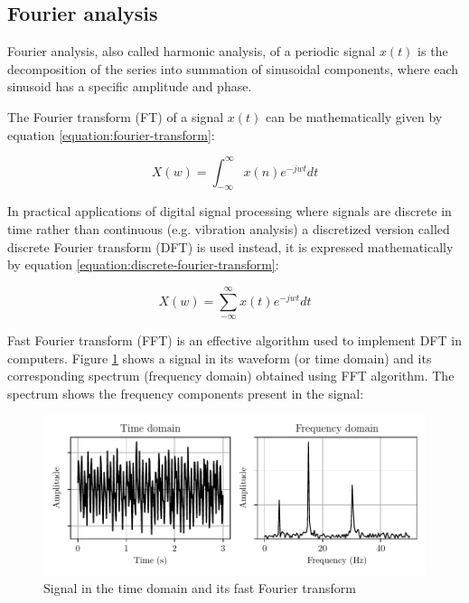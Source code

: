 \subsection{Fourier analysis}
Fourier analysis, also called harmonic analysis, of a periodic signal $x(t)$ is the decomposition of the series into summation of sinusoidal components, where each sinusoid has a specific amplitude and phase.

The Fourier transform (FT) of a signal $x(t)$ can be mathematically given by equation \ref{equation:fourier-transform}:

\begin{equation}
    X(w) = \int_{-\infty}^{\infty}x(n)e^{-jwt}dt
    \label{equation:fourier-transform}
\end{equation}

In practical applications of digital signal processing where signals are discrete in time rather than continuous (e.g. vibration analysis) a discretized version called discrete Fourier transform (DFT) is used instead, it is expressed mathematically by equation \ref{equation:discrete-fourier-transform}:

\begin{equation}
    X(w) = \sum_{-\infty}^{\infty}x(t)e^{-jwt}dt
    \label{equation:discrete-fourier-transform}
\end{equation}

Fast Fourier transform (FFT) is an effective algorithm used to implement DFT in computers. Figure \ref{figure:fft} shows a signal in its waveform (or time domain) and its corresponding spectrum (frequency domain) obtained using FFT algorithm. The spectrum shows the frequency components present in the signal:

\begin{figure}[H]
    \centering
    \includegraphics{figures/fft.pdf}
    \caption{Signal in the time domain and its fast Fourier transform}
    \label{figure:fft}
\end{figure}

